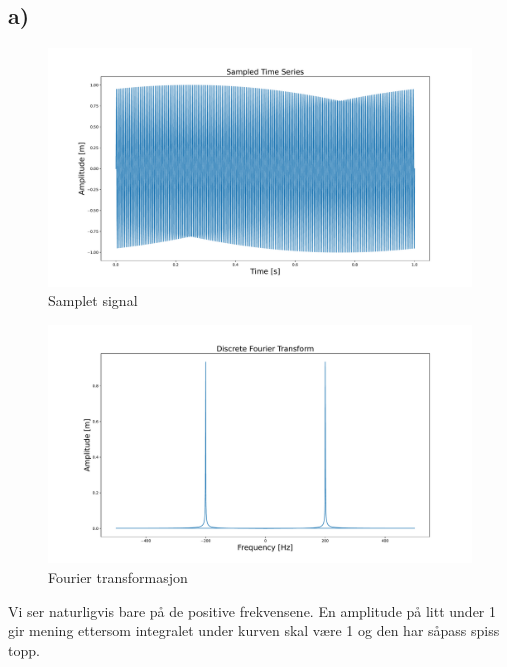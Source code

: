 \documentclass{article}
\begin{document}
\subsection*{a)}
\begin{figure}[h!]
  \centering
  \includegraphics[width = \textwidth]{fig/1.a.1.pdf}
  \caption{Samplet signal}
  \label{fig: 1.a.1}
\end{figure}
\begin{figure}[h!]
  \centering
  \includegraphics[width = \textwidth]{fig/1.a.2.pdf}
  \caption{Fourier transformasjon}
  \label{fig: 1.a.2}
\end{figure}
Vi ser naturligvis bare på de positive frekvensene. En amplitude på litt under 1 gir mening ettersom integralet under kurven skal være 1 og den har såpass spiss topp. 
\end{document}
